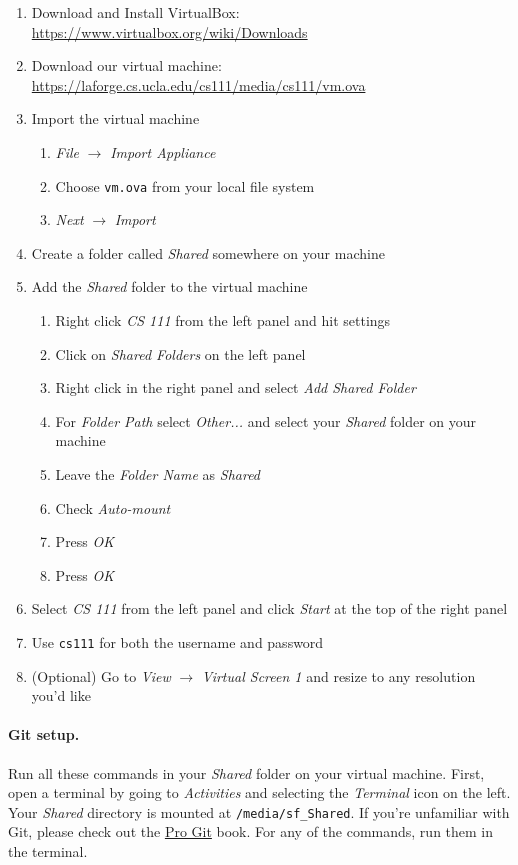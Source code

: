 \begin{enumerate}
  \item Download and Install VirtualBox:
        \url{https://www.virtualbox.org/wiki/Downloads}
  \item Download our virtual machine:
        \url{https://laforge.cs.ucla.edu/cs111/media/cs111/vm.ova}
  \item Import the virtual machine
    \begin{enumerate}
      \item \textit{File} $\rightarrow$ \textit{Import Appliance}
      \item Choose \lstinline|vm.ova| from your local file system
      \item \textit{Next} $\rightarrow$ \textit{Import}
    \end{enumerate}
  \item Create a folder called \textit{Shared} somewhere on your machine
  \item Add the \textit{Shared} folder to the virtual machine
    \begin{enumerate}
      \item Right click \textit{CS 111} from the left panel and hit settings
      \item Click on \textit{Shared Folders} on the left panel
      \item Right click in the right panel and select \textit{Add Shared Folder}
      \item For \textit{Folder Path} select \textit{Other...} and select your
            \textit{Shared} folder on your machine
      \item Leave the \textit{Folder Name} as \textit{Shared}
      \item Check \textit{Auto-mount}
      \item Press \textit{OK}
      \item Press \textit{OK}
    \end{enumerate}
  \item Select \textit{CS 111} from the left panel and click \textit{Start} at
        the top of the right panel
  \item Use \lstinline|cs111| for both the username and password
  \item (Optional) Go to \textit{View} $\rightarrow$ \textit{Virtual Screen 1}
        and resize to any resolution you'd like
\end{enumerate}

\paragraph{Git setup.}
Run all these commands in your \textit{Shared} folder on your virtual machine.
First, open a terminal by going to \textit{Activities} and selecting the
\textit{Terminal} icon on the left.
Your \textit{Shared} directory is mounted at \lstinline|/media/sf_Shared|.
If you're unfamiliar with Git, please check out the
\href{https://git-scm.com/book/en/v2/}{Pro Git} book.
For any of the commands, run them in the terminal.

